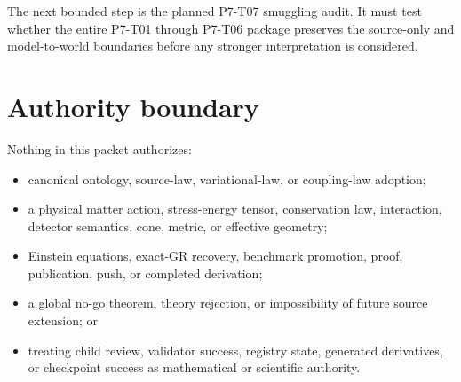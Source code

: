 \documentclass[11pt]{article}
\begin{document}
The next bounded step is the planned P7-T07 smuggling audit.  It must test
whether the entire P7-T01 through P7-T06 package preserves the source-only
and model-to-world boundaries before any stronger interpretation is
considered.

\section{Authority boundary}

Nothing in this packet authorizes:
\begin{itemize}[leftmargin=*]
\item canonical ontology, source-law, variational-law, or coupling-law
adoption;
\item a physical matter action, stress-energy tensor, conservation law,
interaction, detector semantics, cone, metric, or effective geometry;
\item Einstein equations, exact-GR recovery, benchmark promotion, proof,
publication, push, or completed derivation;
\item a global no-go theorem, theory rejection, or impossibility of future
source extension; or
\item treating child review, validator success, registry state, generated
derivatives, or checkpoint success as mathematical or scientific authority.
\end{itemize}
\end{document}
